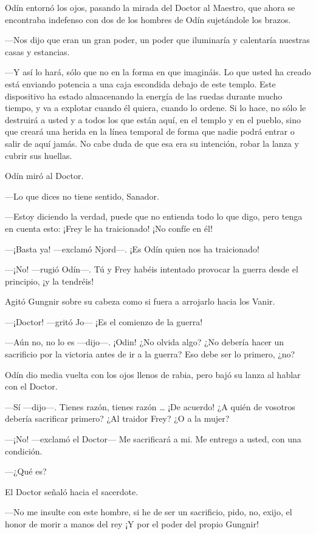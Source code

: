 Odín entornó los ojos, pasando la mirada del Doctor al Maestro, que
ahora se encontraba indefenso con dos de los hombres de Odín sujetándole
los brazos.

---Nos dijo que eran un gran poder, un poder que iluminaría y calentaría
nuestras casas y estancias.

---Y así lo hará, sólo que no en la forma en que imagináis. Lo que usted
ha creado está enviando potencia a una caja escondida debajo de este
templo. Este dispositivo ha estado almacenando la energía de las ruedas
durante mucho tiempo, y va a explotar cuando él quiera, cuando lo
ordene. Si lo hace, no sólo le destruirá a usted y a todos los que están
aquí, en el templo y en el pueblo, sino que creará una herida en la
línea temporal de forma que nadie podrá entrar o salir de aquí jamás. No
cabe duda de que esa era su intención, robar la lanza y cubrir sus
huellas.

Odín miró al Doctor.

---Lo que dices no tiene sentido, Sanador.

---Estoy diciendo la verdad, puede que no entienda todo lo que digo,
pero tenga en cuenta esto: ¡Frey le ha traicionado! ¡No confíe en él!

---¡Basta ya! ---exclamó Njord---. ¡Es Odín quien nos ha traicionado!

---¡No! ---rugió Odín---. Tú y Frey habéis intentado provocar la guerra
desde el principio, ¡y la tendréis!

Agitó Gungnir sobre su cabeza como si fuera a arrojarlo hacia los Vanir.

---¡Doctor! ---gritó Jo--- ¡Es el comienzo de la guerra!

---Aún no, no lo es ---dijo---. ¡Odin! ¿No olvida algo? ¿No debería
hacer un sacrificio por la victoria antes de ir a la guerra? Eso debe
ser lo primero, ¿no?

Odín dio media vuelta con los ojos llenos de rabia, pero bajó su lanza
al hablar con el Doctor.

---Sí ---dijo---. Tienes razón, tienes razón \ldots{} ¡De acuerdo! ¿A
quién de vosotros debería sacrificar primero? ¿Al traidor Frey? ¿O a la
mujer?

---¡No! ---exclamó el Doctor--- Me sacrificará a mi. Me entrego a usted,
con una condición.

---¿Qué es?

El Doctor señaló hacia el sacerdote.

---No me insulte con este hombre, si he de ser un sacrificio, pido, no,
exijo, el honor de morir a manos del rey ¡Y por el poder del propio
Gungnir!

